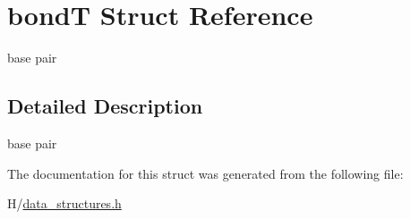 \hypertarget{structbondT}{
\section{bondT Struct Reference}
\label{structbondT}
}


base pair  




\subsection{Detailed Description}
base pair 

The documentation for this struct was generated from the following file:\begin{DoxyCompactItemize}
\item 
H/\hyperlink{data__structures_8h}{data\_\-structures.h}\end{DoxyCompactItemize}
